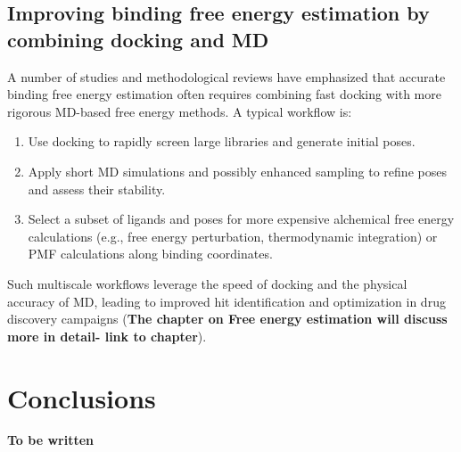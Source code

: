 \documentclass[12pt]{article}
\begin{document}
\subsection{Improving binding free energy estimation by combining docking and MD}

A number of studies and methodological reviews have emphasized that accurate binding free energy estimation often requires combining fast docking with more rigorous MD-based free energy methods.\cite{CH9_Cournia2017,CH9_alonso2006} A typical workflow is:

\begin{enumerate}
\item Use docking to rapidly screen large libraries and generate initial poses.
\item Apply short MD simulations and possibly enhanced sampling to refine poses and assess their stability.
\item Select a subset of ligands and poses for more expensive alchemical free energy calculations (e.g., free energy perturbation, thermodynamic integration) or PMF calculations along binding coordinates.
\end{enumerate}

Such multiscale workflows leverage the speed of docking and the physical accuracy of MD, leading to improved hit identification and optimization in drug discovery campaigns (\textbf{The chapter on Free energy estimation will discuss more in detail- link to chapter}).

\section{Conclusions}

\textbf{To be written}



\end{document}
